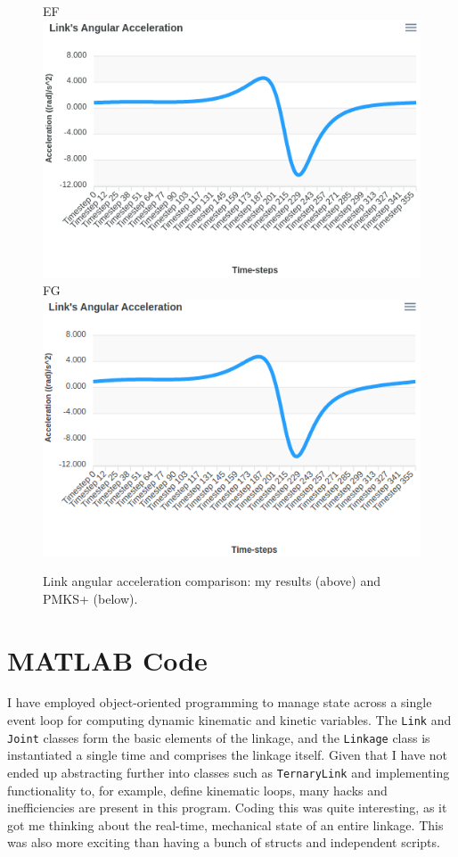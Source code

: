 \documentclass[12pt]{article}
\begin{document}
\begin{figure}[ht]
  EF \includegraphics[scale=0.4]{../pmks-plots/angLinkAcc/angLinkAccEF.png}%
  FG \includegraphics[scale=0.4]{../pmks-plots/angLinkAcc/angLinkAccFG.png}%
  \caption{\label{fig:compare.angLinkAcc}Link angular acceleration comparison: my results (above) and PMKS+ (below).}
\end{figure}


\section{MATLAB Code}%
\label{code}

I have employed object-oriented programming to manage state across a single event loop for computing dynamic kinematic and kinetic variables. The \texttt{Link} and \texttt{Joint} classes form the basic elements of the linkage, and the \texttt{Linkage} class is instantiated a single time and comprises the linkage itself. Given that I have not ended up abstracting further into classes such as \texttt{TernaryLink} and implementing functionality to, for example, define kinematic loops, many hacks and inefficiencies are present in this program. Coding this was quite interesting, as it got me thinking about the real-time, mechanical state of an entire linkage. This was also more exciting than having a bunch of structs and independent scripts.
\end{document}
